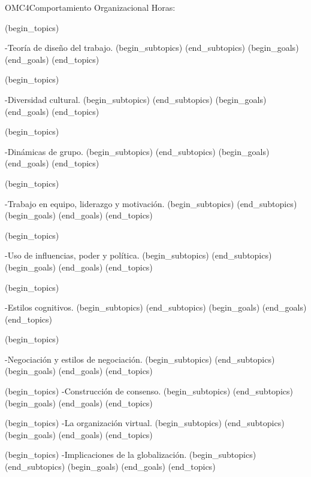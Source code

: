 \begin{BKL2}{OMC4}{Comportamiento Organizacional}
Horas:
 
(begin_topics)

-Teoría de diseño del trabajo.
(begin_subtopics)
(end_subtopics)
(begin_goals)
(end_goals)
(end_topics)

 

(begin_topics)

-Diversidad cultural.
(begin_subtopics)
(end_subtopics)
(begin_goals)
(end_goals)
(end_topics)

 

(begin_topics)

-Dinámicas de grupo.
(begin_subtopics)
(end_subtopics)
(begin_goals)
(end_goals)
(end_topics)

 

(begin_topics)

-Trabajo en equipo, liderazgo y motivación.
(begin_subtopics)
(end_subtopics)
(begin_goals)
(end_goals)
(end_topics)

 

(begin_topics)

-Uso de influencias, poder y política.
(begin_subtopics)
(end_subtopics)
(begin_goals)
(end_goals)
(end_topics)

 

(begin_topics)

-Estilos cognitivos.
(begin_subtopics)
(end_subtopics)
(begin_goals)
(end_goals)
(end_topics)

 

(begin_topics)

-Negociación y estilos de negociación.
(begin_subtopics)
(end_subtopics)
(begin_goals)
(end_goals)
(end_topics)

 

(begin_topics)
-Construcción de consenso.
(begin_subtopics)
(end_subtopics)
(begin_goals)
(end_goals)
(end_topics)

(begin_topics)
-La organización virtual.
(begin_subtopics)
(end_subtopics)
(begin_goals)
(end_goals)
(end_topics)

(begin_topics)
-Implicaciones de la globalización.
(begin_subtopics)
(end_subtopics)
(begin_goals)
(end_goals)
(end_topics)

\end{BKL2}



